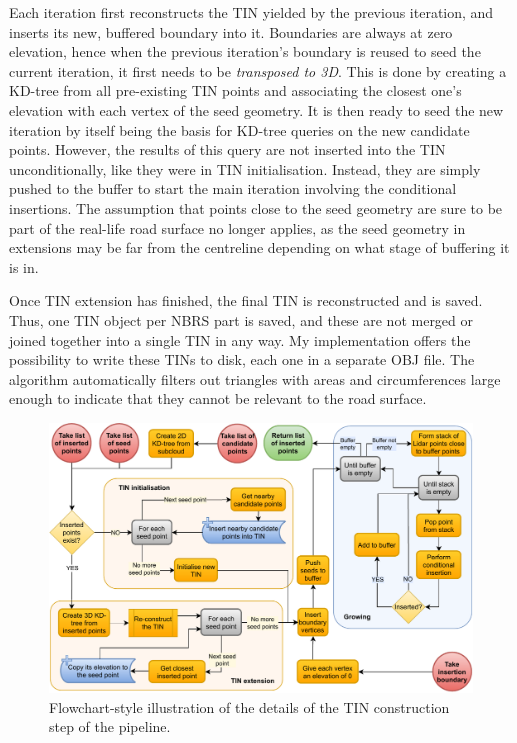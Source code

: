 Each iteration first reconstructs the TIN yielded by the previous iteration, and inserts its new, buffered boundary into it. Boundaries are always at zero elevation, hence when the previous iteration's boundary is reused to seed the current iteration, it first needs to be \textit{transposed to 3D}. This is done by creating a KD-tree from all pre-existing TIN points and associating the closest one's elevation with each vertex of the seed geometry. It is then ready to seed the new iteration by itself being the basis for KD-tree queries on the new candidate points. However, the results of this query are not inserted into the TIN unconditionally, like they were in TIN initialisation. Instead, they are simply pushed to the buffer to start the main iteration involving the conditional insertions. The assumption that points close to the seed geometry are sure to be part of the real-life road surface no longer applies, as the seed geometry in extensions may be far from the centreline depending on what stage of buffering it is in.

Once TIN extension has finished, the final TIN is reconstructed and is saved. Thus, one TIN object per NBRS part is saved, and these are not merged or joined together into a single TIN in any way. My implementation offers the possibility to write these TINs to disk, each one in a separate OBJ file. The algorithm automatically filters out triangles with areas and circumferences large enough to indicate that they cannot be relevant to the road surface.

\begin{figure}
    \centering
    \includegraphics[width=0.9\linewidth]{final_report/figs/tin_construction_details.pdf}
    \caption{Flowchart-style illustration of the details of the TIN construction step of the pipeline.}
    \label{fig:tinconstructiondetailsflow}
\end{figure}

